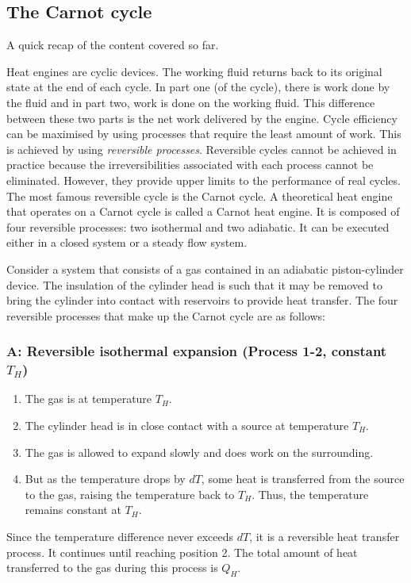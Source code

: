 \documentclass[class=report, crop=false, 12pt,a4paper]{standalone}
\begin{document}
\subsection{The Carnot cycle}
A quick recap of the content covered so far.

Heat engines are cyclic devices. The working fluid returns back to its original state at the end of each cycle. In part one (of the cycle), there is work done by the fluid and in part two, work is done on the working fluid. This difference between these two parts is the net work delivered by the engine. Cycle efficiency can be maximised by using processes that require the least amount of work. This is achieved by using \emph{reversible processes}. Reversible cycles cannot be achieved in practice because the irreversibilities associated with each process cannot be eliminated. However, they provide upper limits to the performance of real cycles. The most famous reversible cycle is the Carnot cycle. A theoretical heat engine that operates on a Carnot cycle is called a Carnot heat engine. It is composed of four reversible processes: two isothermal and two adiabatic. It can be executed either in a closed system or a steady flow system.

Consider a system that consists of a gas contained in an adiabatic piston-cylinder device. The insulation of the cylinder head is such that it may be removed to bring the cylinder into contact with reservoirs to provide heat transfer. The four reversible processes that make up the Carnot cycle are as follows: 
\subsubsection{A: Reversible isothermal expansion (Process 1-2, constant $T_H$)}
\begin{enumerate}[noitemsep]
  \item The gas is at temperature $T_H$.
  \item The cylinder head is in close contact with a source at temperature $T_H$.
  \item The gas is allowed to expand slowly and does work on the surrounding.
  \item But as the temperature drops by $dT$, some heat is transferred from the source to the gas, raising the temperature back to $T_H$. Thus, the temperature remains constant at $T_H$.
\end{enumerate}
Since the temperature difference never exceeds $dT$, it is a reversible heat transfer process. It continues until reaching position 2. The total amount of heat transferred to the gas during this process is $Q_H$.
\end{document}
